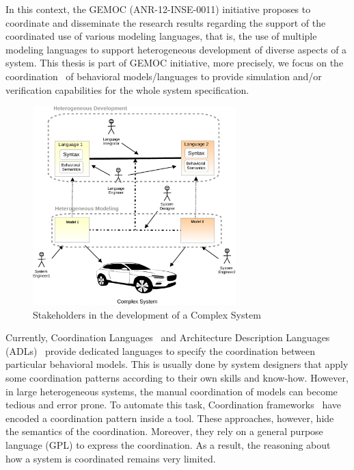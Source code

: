In this context, the GEMOC (ANR-12-INSE-0011) initiative proposes to coordinate and disseminate the research results regarding the support of the coordinated use of various modeling languages, that is, the use of multiple modeling languages to support heterogeneous development of diverse aspects of a system. This thesis is part of GEMOC initiative, more precisely, we focus on the coordination~\cite{coordsignibib} of behavioral models/languages to provide simulation and/or verification capabilities for the whole system specification. 


\begin{figure}
	\begin{center}
		\includegraphics[width=0.7\textwidth]{introduction/stakeholders}
		\caption{Stakeholders in the development of a Complex System}
		\label{fig:stackeholders}
	\end{center}
\end{figure}
	
Currently, Coordination Languages~\cite{coordsignibib} and Architecture Description Languages (ADLs)~\cite{frameadlsbib} provide dedicated languages to specify the coordination between particular behavioral models. This is usually done by system designers that apply some coordination patterns according to their own skills and know-how. However, in large heterogeneous systems, the manual coordination of models can become tedious and error prone. To automate this task, Coordination frameworks~\cite{ptoleframebib,modhelxbib} have encoded a coordination pattern inside a tool. These approaches, however, hide the semantics of the coordination. Moreover, they rely on a general purpose language (GPL) to express the coordination. As a result, the reasoning about how a system is coordinated remains very limited.  
	
